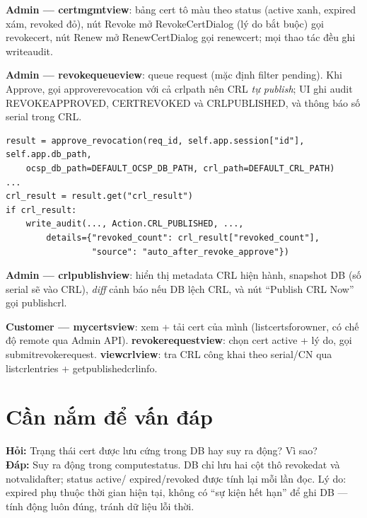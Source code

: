 \documentclass[12pt,a4paper]{article}
\newcommand{\code}[1]{{\ttfamily\small\def\_{\textunderscore\discretionary{}{}{}}#1}}
\begin{document}
\textbf{Admin --- \code{cert\_mgmt\_view}}: bảng cert tô màu theo status
(active xanh, expired xám, revoked đỏ), nút Revoke mở \code{RevokeCertDialog}
(lý do bắt buộc) gọi \code{revoke\_cert}, nút Renew mở \code{RenewCertDialog} gọi
\code{renew\_cert}; mọi thao tác đều ghi \code{write\_audit}.

\textbf{Admin --- \code{revoke\_queue\_view}}: queue request (mặc định filter
\code{pending}). Khi Approve, gọi \code{approve\_revocation} với cả
\code{crl\_path} nên CRL \emph{tự publish}; UI ghi audit \code{REVOKE\_APPROVED},
\code{CERT\_REVOKED} và \code{CRL\_PUBLISHED}, và thông báo số serial trong CRL.

\begin{Verbatim}
result = approve_revocation(req_id, self.app.session["id"], self.app.db_path,
    ocsp_db_path=DEFAULT_OCSP_DB_PATH, crl_path=DEFAULT_CRL_PATH)
...
crl_result = result.get("crl_result")
if crl_result:
    write_audit(..., Action.CRL_PUBLISHED, ...,
        details={"revoked_count": crl_result["revoked_count"],
                 "source": "auto_after_revoke_approve"})
\end{Verbatim}

\textbf{Admin --- \code{crl\_publish\_view}}: hiển thị metadata CRL hiện hành,
snapshot DB (số serial sẽ vào CRL), \emph{diff} cảnh báo nếu DB lệch CRL, và nút
``Publish CRL Now'' gọi \code{publish\_crl}.

\textbf{Customer --- \code{my\_certs\_view}}: xem + tải cert của mình
(\code{list\_certs\_for\_owner}, có chế độ remote qua Admin API).
\textbf{\code{revoke\_request\_view}}: chọn cert active + lý do, gọi
\code{submit\_revoke\_request}. \textbf{\code{view\_crl\_view}}: tra CRL công
khai theo serial/CN qua \code{list\_crl\_entries} + \code{get\_published\_crl\_info}.

\section{Cần nắm để vấn đáp}

\begin{qabox}
\textbf{Hỏi:} Trạng thái cert được lưu cứng trong DB hay suy ra động? Vì sao?\\[2pt]
\textbf{Đáp:} Suy ra động trong \code{\_compute\_status}. DB chỉ lưu hai cột thô
\code{revoked\_at} và \code{not\_valid\_after}; status \code{active}/
\code{expired}/\code{revoked} được tính lại mỗi lần đọc. Lý do: \code{expired}
phụ thuộc thời gian hiện tại, không có ``sự kiện hết hạn'' để ghi DB --- tính
động luôn đúng, tránh dữ liệu lỗi thời.
\end{qabox}
\end{document}
